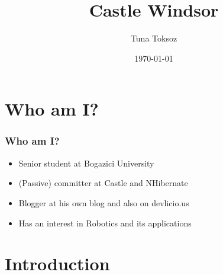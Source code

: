 \documentclass[turkish]{beamer}
\title{Castle Windsor}
\author{Tuna Toksoz}
\date{\today}
\begin{document}
\frame
{
	\titlepage
}

\section[Agenda]{}
\frame{\tableofcontents}
\section{Who am I?}
	\frame
	{
	  \frametitle{Who am I?}
	 	\begin{itemize}
		  \item<1-> Senior student at Bogazici University
		  \item<2-> (Passive) committer at Castle and NHibernate
		  \item<3-> Blogger at his own blog and also on devlicio.us
		  \item<4-> Has an interest in Robotics and its applications
	  \end{itemize}
	}

\section{Introduction}
\end{document}
